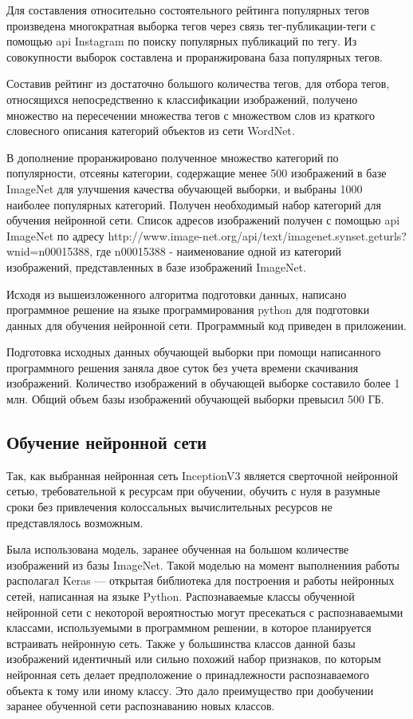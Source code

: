 Для составления относительно состоятельного рейтинга популярных тегов произведена многократная выборка тегов через связь тег-публикации-теги с помощью api Instagram по поиску популярных публикаций по тегу. 
Из совокупности выборок составлена и проранжирована база популярных тегов.


Составив рейтинг из достаточно большого количества тегов, для отбора тегов, относящихся непосредственно к классификации изображений, получено множество на пересечении множества тегов с множеством слов из краткого словесного описания категорий объектов из сети WordNet. 


В дополнение проранжировано полученное множество категорий по популярности, отсеяны категории, содержащие менее 500 изображений в базе ImageNet для улучшения качества обучающей выборки, и выбраны 1000 наиболее популярных категорий. 
Получен необходимый набор категорий для обучения нейронной сети. 
Список адресов изображений получен с помощью api ImageNet по адресу http://www.image-net.org/api/text/imagenet.synset.geturls?wnid=n00015388, где n00015388 - наименование одной из категорий изображений, представленных в базе изображений ImageNet.

Исходя из вышеизложенного алгоритма подготовки данных, написано программное решение на языке программирования python для подготовки данных для обучения нейронной сети. Программный код приведен в приложении.

Подготовка исходных данных обучающей выборки при помощи написанного программного решения заняла двое суток без учета времени скачивания изображений. 
Количество изображений в обучающей выборке составило более 1 млн. 
Общий объем базы изображений обучающей выборки превысил 500 ГБ.

\subsection{Обучение нейронной сети}

Так, как выбранная нейронная сеть InceptionV3 является сверточной нейронной сетью, требовательной к ресурсам при обучении, обучить с нуля в разумные сроки без привлечения колоссальных вычислительных ресурсов не представлялось возможным.

Была использована модель, заранее обученная на большом количестве изображений из базы ImageNet. 
Такой моделью на момент выполнениия работы располагал Keras — открытая библиотека для построения и работы нейронных сетей, написанная на языке Python. 
Распознаваемые классы обученной нейронной сети с некоторой вероятностью могут пресекаться с распознаваемыми классами, используемыми в программном решении, в которое планируется встраивать нейронную сеть. 
Также у большинства классов данной базы изображений идентичный или сильно похожий набор признаков, по которым нейронная сеть делает предположение о принадлежности распознаваемого объекта к тому или иному классу. 
Это дало преимущество при дообучении заранее обученной сети распознаванию новых классов.

